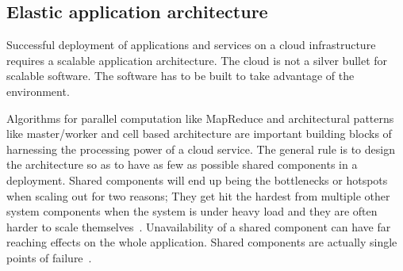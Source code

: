 \documentclass[english]{tktltiki2}
\theoremstyle{definition}
\theoremstyle{remark}
\begin{document}


\subsection{Elastic application architecture}
\label{sec:elasticApplicationArchitecture}

Successful deployment of applications and services on a cloud infrastructure
requires a scalable application architecture. The cloud is not a silver bullet
for scalable software. The software has to be built to take advantage of the
environment.

Algorithms for parallel computation like MapReduce and architectural patterns
like master/worker and cell based architecture  are important building blocks of
harnessing the processing power of a cloud service. The general rule is to
design the architecture so as to have as few as possible shared components in a
deployment. Shared components will end up being the bottlenecks or hotspots when
scaling out for two reasons; They get hit the hardest from multiple other system
components when the system is under heavy load and they are often harder to
scale themselves~\cite{caseforsharednothing}. Unavailability of a
shared component can have far reaching effects on the whole application. Shared
components are actually single points of failure~\cite{cloudarchitecturepatternsbook}.
\end{document}

